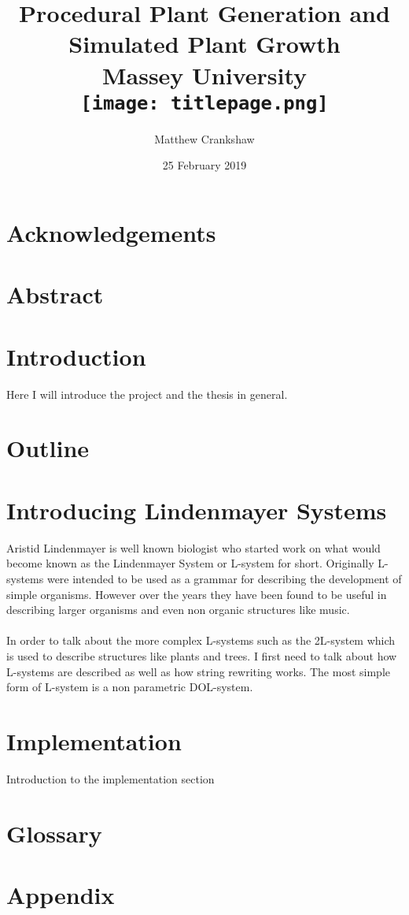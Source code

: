 \documentclass[11pt]{report}
\title{
{ Procedural Plant Generation and Simulated Plant Growth }\\
{\large Massey University}
\\
\vspace{2cm}
{\texttt{[image: titlepage.png]}}
\vspace{2cm}
}
\author{Matthew Crankshaw}
\date{25 February 2019}
\begin{document}
\maketitle

\chapter*{Acknowledgements}

\chapter*{Abstract}

\tableofcontents
\listoffigures


\chapter{Introduction}

Here I will introduce the project and the thesis in general.



\chapter{Outline}



\chapter{Introducing Lindenmayer Systems}

Aristid Lindenmayer is well known biologist who started work on what would become known as the Lindenmayer System or L-system for short. Originally L-systems were intended to be used as a grammar for describing the development of simple organisms. However over the years they have been found to be useful in describing larger organisms and even non organic structures like music. \cite{worth2005growing} \\
\\
In order to talk about the more complex L-systems such as the 2L-system which is used to describe structures like plants and trees. I first need to talk about how L-systems are described as well as how string rewriting works. The most simple form of L-system is a non parametric DOL-system.    



\chapter{Implementation}

Introduction to the implementation section



\chapter{Glossary}
\clearpage
\printglossaries

\appendix
\chapter{Appendix}

\end{document}
